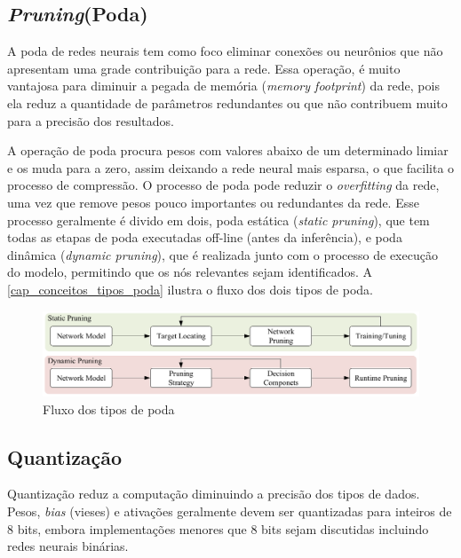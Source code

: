 \subsection{\textit{Pruning}(Poda)}\label{poda}

A poda de redes neurais tem como foco eliminar conexões ou neurônios que não apresentam uma grade contribuição para a
rede.
Essa operação, é muito vantajosa para diminuir a pegada de memória (\textit{memory footprint}) da rede, pois ela reduz
a quantidade de parâmetros redundantes ou que não contribuem muito para a precisão dos resultados.

A operação de poda procura pesos com valores abaixo de um determinado limiar e os muda para a zero, assim deixando
a rede neural mais esparsa, o que facilita o processo de compressão.
O processo de poda pode reduzir o \textit{overfitting} da rede, uma vez que remove pesos pouco importantes ou redundantes
da rede.
Esse processo geralmente é divido em dois, poda estática (\textit{static pruning}), que tem todas as etapas de poda
executadas off-line (antes da inferência), e poda dinâmica (\textit{dynamic pruning}), que é realizada junto com
o processo de execução do modelo, permitindo que os nós relevantes sejam identificados. A
\autoref{cap_conceitos_tipos_poda} ilustra o fluxo dos dois tipos de poda.

\begin{figure}[htb]
	\begin{center}
		\includegraphics[scale=0.5]{Imagens/categorias-poda}
	\end{center}
	\caption {\label{cap_conceitos_tipos_poda}Fluxo dos tipos de poda}
\end{figure}

\subsection{Quantização}\label{quantizacao}

Quantização reduz a computação diminuindo a precisão dos tipos de dados. Pesos, \textit{bias} (vieses) e ativações
geralmente devem ser quantizadas para inteiros de 8 bits, embora implementações menores que 8 bits sejam discutidas
incluindo redes neurais binárias. \cite{LIANG2021370}

